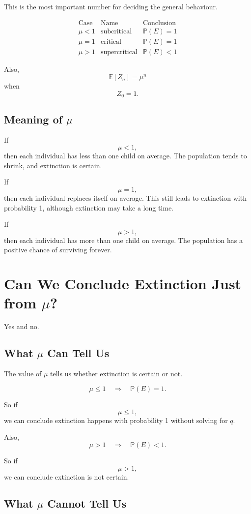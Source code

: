 \documentclass[12pt,a4paper]{article}
\theoremstyle{notestyle}
\newcommand{\Prob}{\mathbb{P}}
\newcommand{\E}{\mathbb{E}}
\begin{document}
This is the most important number for deciding the general behaviour.

\[
\begin{array}{c|c|c}
\text{Case} & \text{Name} & \text{Conclusion}\\
\hline
\mu<1 & \text{subcritical} & \Prob(E)=1\\
\mu=1 & \text{critical} & \Prob(E)=1\\
\mu>1 & \text{supercritical} & \Prob(E)<1
\end{array}
\]

Also,
\[
\E[Z_n]=\mu^n
\]
when
\[
Z_0=1.
\]

\subsection*{Meaning of $\mu$}

If
\[
\mu<1,
\]
then each individual has less than one child on average. The population tends to shrink, and extinction is certain.

If
\[
\mu=1,
\]
then each individual replaces itself on average. This still leads to extinction with probability 1, although extinction may take a long time.

If
\[
\mu>1,
\]
then each individual has more than one child on average. The population has a positive chance of surviving forever.

\section{Can We Conclude Extinction Just from $\mu$?}

Yes and no.

\subsection*{What $\mu$ Can Tell Us}

The value of $\mu$ tells us whether extinction is certain or not.

\[
\boxed{
\mu\leq 1 \quad\Longrightarrow\quad \Prob(E)=1.
}
\]

So if
\[
\mu\leq1,
\]
we can conclude extinction happens with probability 1 without solving for $q$.

Also,
\[
\boxed{
\mu>1 \quad\Longrightarrow\quad \Prob(E)<1.
}
\]

So if
\[
\mu>1,
\]
we can conclude extinction is not certain.

\subsection*{What $\mu$ Cannot Tell Us}
\end{document}
